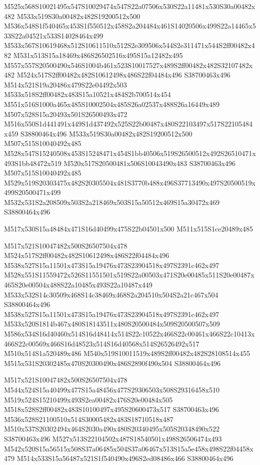 \documentclass{article}
\begin{document}
\begin{multicols}{2}
M525x568S10021495x547S10029474x547S22a07506x530S22a11481x530S30a00482x482 M533x519S30a00482x482S19200512x500 M536x548S1f540465x453S1f550512x458S2a204484x461S14020506x499S22a14465x533S22a04521x533S14028464x499 M533x567S10619468x512S10611510x512S2e309506x544S2e311471x544S2ff00482x482 M531x513S15a18469x486S26502516x495S15a12482x495 M557x557S20500490x546S1004b461x523S10017527x489S2ff00482x482S32107482x482 M524x517S2ff00482x482S10612498x486S22f04484x496 S38700463x496 M514x521S19a20486x479S22e04492x503 M533x518S2ff00482x483S15a10521x484S2b700514x454 M551x516S1000a465x485S10002504x485S26a02537x488S26a16449x489 M507x528S15a20493x501S26500493x472 M516x550S1d441491x449S1d437492x525S22b00487x480S22103497x517S22105484x459 S38800464x496 M533x519S30a00482x482S19200512x500 M507x515S10040492x485 M528x547S15240508x453S15248471x454S1bb40506x519S26500512x492S26510471x493S1bb48472x519 M520x517S20500481x506S10043490x483 S38700463x496 M507x515S10040492x485 M529x519S20303475x482S20305504x481S3770b488x496S37713490x497S20500519x499S20500471x499 M532x531S2a208509x503S2a218469x503S15a50512x469S15a30472x469 S38800464x496

\begin{center}
M517x530S15a48484x471S16d40499x475S22b04501x500 M511x515S1ce20489x485 
\end{center}


M517x521S10047482x500S26507504x478 M524x517S2ff00482x482S10612498x486S22f04484x496 M538x527S15a11501x473S15a19476x473S23904518x497S2391c462x497 M528x551S11559472x526S11551501x519S22a00503x471S20e00485x511S20e00487x465S20e00504x488S22a10485x493S22a10487x449 M533x532S14c30509x468S14c38469x468S2a204510x504S2a21c467x504 S38800464x496 M538x527S15a11501x473S15a19476x473S23904518x497S2391c462x497 M533x520S1814b467x480S18143511x480S20500484x509S20500507x509 M586x534S16d40460x514S16d48414x514S22c10522x466S22c00461x466S22c10413x466S22c00569x466S16d48523x514S16d40568x514S26526492x517 M510x514S1a520489x486 M540x519S10011519x489S2ff00482x482S28108514x455 M515x531S20302485x470S20300490x486S2890f490x504 S38800464x496

M517x521S10047482x500S26507504x478 M544x524S15a40499x477S15a48456x477S29306503x508S29316458x510 M519x524S15210499x493S2ea00482x476S20e00484x505 M518x528S2ff00482x483S10100497x495S20600473x517 S38700463x496 M536x528S21100510x514S30005482x483S18710518x487 M510x537S20302494x464S2030a490x480S20340495x505S20348490x522 S38700463x496 M527x513S22104502x487S18540501x498S26506474x493 M542x520S15a56515x508S37a06485x504S37a06467x513S15a5e458x498S22f04458x479 M514x533S15a56487x521S1f540490x496S2ed08486x466 S38800464x496


\end{multicols}
\end{document}
